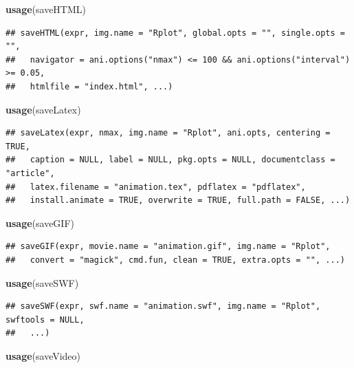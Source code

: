 \documentclass[
  b5paper,
  UTF8,twoside]{book}
\newenvironment{Shaded}{\begin{snugshade}}{\end{snugshade}}
\newcommand{\FunctionTok}[1]{\textcolor[rgb]{0.13,0.29,0.53}{\textbf{#1}}}
\newcommand{\NormalTok}[1]{#1}
\begin{document}
\begin{Shaded}
\begin{Highlighting}[]
\FunctionTok{usage}\NormalTok{(saveHTML)}
\end{Highlighting}
\end{Shaded}

\begin{verbatim}
## saveHTML(expr, img.name = "Rplot", global.opts = "", single.opts = "",
##   navigator = ani.options("nmax") <= 100 && ani.options("interval") >= 0.05,
##   htmlfile = "index.html", ...)
\end{verbatim}

\begin{Shaded}
\begin{Highlighting}[]
\FunctionTok{usage}\NormalTok{(saveLatex)}
\end{Highlighting}
\end{Shaded}

\begin{verbatim}
## saveLatex(expr, nmax, img.name = "Rplot", ani.opts, centering = TRUE,
##   caption = NULL, label = NULL, pkg.opts = NULL, documentclass = "article",
##   latex.filename = "animation.tex", pdflatex = "pdflatex",
##   install.animate = TRUE, overwrite = TRUE, full.path = FALSE, ...)
\end{verbatim}

\begin{Shaded}
\begin{Highlighting}[]
\FunctionTok{usage}\NormalTok{(saveGIF)}
\end{Highlighting}
\end{Shaded}

\begin{verbatim}
## saveGIF(expr, movie.name = "animation.gif", img.name = "Rplot",
##   convert = "magick", cmd.fun, clean = TRUE, extra.opts = "", ...)
\end{verbatim}

\begin{Shaded}
\begin{Highlighting}[]
\FunctionTok{usage}\NormalTok{(saveSWF)}
\end{Highlighting}
\end{Shaded}

\begin{verbatim}
## saveSWF(expr, swf.name = "animation.swf", img.name = "Rplot", swftools = NULL,
##   ...)
\end{verbatim}

\begin{Shaded}
\begin{Highlighting}[]
\FunctionTok{usage}\NormalTok{(saveVideo)}
\end{Highlighting}
\end{Shaded}
\end{document}
